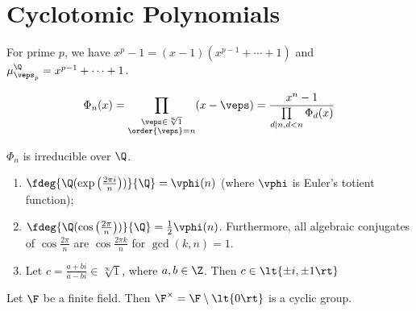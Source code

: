 \documentclass[a4paper]{article}
\begin{document}
\section{Cyclotomic Polynomials}

\begin{ttheorem}
  For prime \( p \), we have \( x^p-1 = (x-1)(x^{p-1} + \cdots + 1) \) and \( \mu_{\veps_p}^\Q = x^{p-1} + \cdots + 1 \).
\end{ttheorem}

\begin{tdefinition}
  \begin{align*}
    \Phi_n(x) = \prod_{\substack{\veps\in\sqrt[n]1\\\order{\veps}=n}} (x-\veps) = \frac{x^n-1}{\prod\limits_{\substack{d\mid n,d<n}}\Phi_d(x)}
  \end{align*}
\end{tdefinition}

\begin{ttheorem}
  \( \Phi_n \) is irreducible over \( \Q \).
\end{ttheorem}

\begin{tcorollary}
  \begin{enumerate}[label=\nf{(\alph*)}]
    \item \( \fdeg{\Q(\exp\left(\frac{2\pi i}{n}\right))}{\Q} = \vphi(n) \) (where \( \vphi \) is Euler's totient function);
    \item \( \fdeg{\Q(\cos\left(\frac{2\pi }{n}\right))}{\Q} = \frac{1}{2}\vphi(n) \).
    Furthermore, all algebraic conjugates of \( \cos \frac{2\pi}{n} \) are \( \cos \frac{2\pi k}{n} \) for \( \gcd(k,n)=1 \).
    \item Let \( c = \frac{a+bi}{a-bi}\in \sqrt[\infty] 1 \), where \( a,b\in \Z \). Then \( c\in \lt\{ \pm i,\pm 1 \rt\} \)
  \end{enumerate}
\end{tcorollary}

\begin{tlemma}
  Let \( \F \) be a finite field. Then \( \F^\times = \F \setminus \lt\{ 0 \rt\} \) is a cyclic group.
\end{tlemma}
\end{document}

